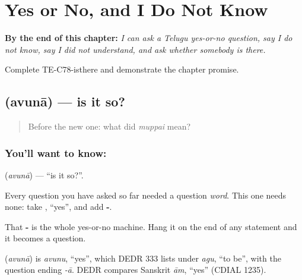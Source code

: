 
\chapter{Yes or No, and I Do Not Know}
\label{ch:te-yes-or-no}

\begin{chapteropening}
\textbf{By the end of this chapter:} \emph{I can ask a Telugu yes-or-no question, say I do not know, say I did not understand, and ask whether somebody is there.}

Complete TE-C78-isthere and demonstrate the chapter promise.
\end{chapteropening}

\section[\texorpdfstring{\te{అవునా} (avunā)}{అవునా (avunā)}]{ (avunā) — is it so?}

\label{lesson:TE-C78-isit}



\begin{quote}
Before the new one: what did \emph{muppai} mean?
\end{quote}

\subsection*{You'll want to know: }
\textbf{} (\emph{avunā}) — \textquotedblleft{}is it so?\textquotedblright{}.

Every question you have asked so far needed a question \emph{word}. This one needs none: take , \textquotedblleft{}yes\textquotedblright{}, and add \textbf{-}.

That \textbf{-} is the whole yes-or-no machine. Hang it on the end of any statement and it becomes a question.

\begin{cousinweb}
\textbf{} (\emph{avunā}) is \emph{avunu}, \textquotedblleft{}yes\textquotedblright{}, which DEDR 333 lists under \emph{agu}, \textquotedblleft{}to be\textquotedblright{}, with the question ending \emph{-ā}. DEDR compares Sanskrit \emph{ām}, \textquotedblleft{}yes\textquotedblright{} (CDIAL 1235).
\end{cousinweb}

